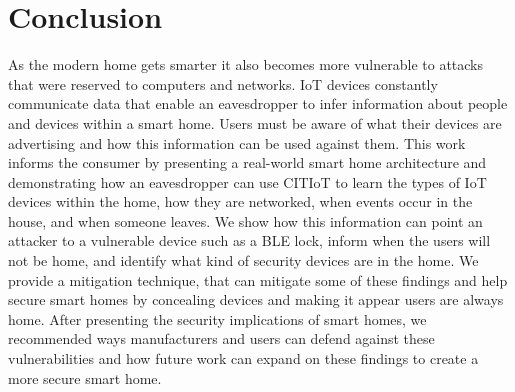 \documentclass[journal]{./IEEEtran/IEEEtran}
\begin{document}
\section{Conclusion}\label{conclusion}
As the modern home gets smarter it also becomes more vulnerable to attacks that were reserved to computers and networks. \ac{IoT} devices constantly communicate data that enable an eavesdropper to infer information about people and devices within a smart home. Users must be aware of what their devices are advertising and how this information can be used against them. This work informs the consumer by presenting a real-world smart home architecture and demonstrating how an eavesdropper can use CITIoT to learn the types of \ac{IoT} devices within the home, how they are networked, when events occur in the house, and when someone leaves. We show how this information can point an attacker to a vulnerable device such as a \ac{BLE} lock, inform when the users will not be home, and identify what kind of security devices are in the home. We provide a mitigation technique, that can mitigate some of these findings and help secure smart homes by concealing devices and making it appear users are always home. After presenting the security implications of smart homes, we recommended ways manufacturers and users can defend against these vulnerabilities and how future work can expand on these findings to create a more secure smart home.


 
\end{document}
